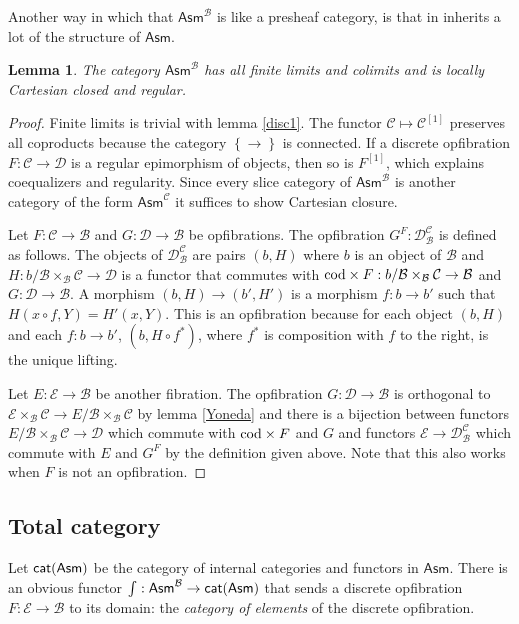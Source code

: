\documentclass{amsart}
\theoremstyle{plain}
\newtheorem{lemma}[theorem]{Lemma}
\theoremstyle{definition}
\newcommand\cat\mathcal
\newcommand\set[1]{\left\{#1\right\}}
\newcommand\ri{^*}
\newcommand\Asm{\mathsf{Asm}}
\newcommand\sier{{[1]}}
\begin{document}
Another way in which that $\Asm^{\cat B}$ is like a presheaf category, is that in inherits a lot of the structure of $\Asm$.

\begin{lemma} The category $\Asm^{\cat B}$ has all finite limits and colimits and is locally Cartesian closed and regular. \end{lemma}

\begin{proof} Finite limits is trivial with lemma \ref{disc1}. The functor $\cat C \mapsto \cat C^\sier$ preserves all coproducts because the category $\set\to$ is connected. If a discrete opfibration $F:\cat C\to\cat D$ is a regular epimorphism of objects, then so is $F^\sier$, which explains coequalizers and regularity. Since every slice category of $\Asm^{\cat B}$ is another category of the form $\Asm^{\cat C}$ it suffices to show Cartesian closure. 

Let $F:\cat C\to\cat B$ and $G:\cat D\to\cat B$ be opfibrations. The opfibration $G^F:\cat D^{\cat C}_{\cat B}$ is defined as follows. The objects of $\cat D^{\cat C}_{\cat B}$ are pairs $(b,H)$ where $b$ is an object of $\cat B$ and $H:b/\cat B \times_{\cat B} \cat C\to \cat D$ is a functor that commutes with $\cod\times F:b/\cat B \times_{\cat B} \cat C \to \cat B$ and $G:\cat D \to \cat B$. A morphism $(b,H) \to (b', H')$ is a morphism $f:b\to b'$ such that $H(x\circ f,Y) = H'(x,Y)$. This is an opfibration because for each object $(b,H)$ and each $f:b\to b'$, $(b,H\circ f\ri)$, where $f\ri$ is composition with $f$ to the right, is the unique lifting.

Let $E:\cat E\to\cat B$ be another fibration. The opfibration $G:\cat D\to\cat B$ is orthogonal to $\cat E\times_{\cat B}\cat C \to E/\cat B\times_{\cat B} \cat C$ by lemma \ref{Yoneda} and there is a bijection between functors $E/\cat B\times_{\cat B} \cat C \to\cat D$ which commute with $\mathrm{cod}\times F$ and $G$ and functors $\cat E \to \cat D^{\cat C}_{\cat B}$ which commute with $E$ and $G^F$ by the definition given above. Note that this also works when $F$ is not an opfibration.
\end{proof}

\subsection{Total category}
Let $\mathsf{cat(Asm)}$ be the category of internal categories and functors in $\Asm$. There is an obvious functor $\tot:\Asm^{\cat B} \to \catasm$ that sends a discrete opfibration $F:\cat E\to\cat B$ to its domain: the \emph{category of elements} of the discrete opfibration.
\end{document}
